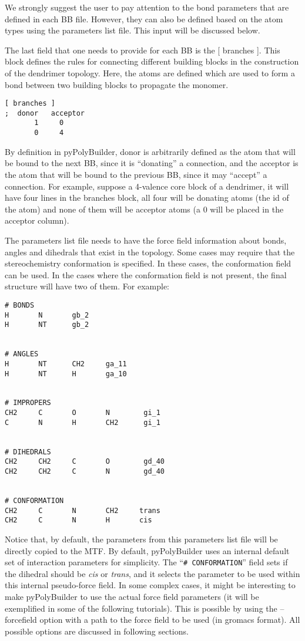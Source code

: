 \documentclass[12pt]{article}
\begin{document}
We strongly suggest the user to pay attention to the bond parameters that are defined in each BB file.
However, they can also be defined based on the atom types using the  parameters list file.
This input will be discussed below.

The last field that one needs to provide for each BB is the [ branches ].
This block defines the rules for connecting different building blocks in the construction of the dendrimer topology.
Here, the atoms are defined which are used to form a bond between two building blocks to propagate the monomer.
\begin{lstlisting}
[ branches ]
;  donor   acceptor
       1	 0
       0	 4
\end{lstlisting}

By definition in pyPolyBuilder,  donor is arbitrarily defined as the  atom that will be bound to the next BB, since it is ``donating'' a connection, and the acceptor is the atom that will be bound to the previous BB, since it may ``accept'' a connection. For example, suppose a 4-valence core block of a dendrimer, it will have four lines in the branches block, all four will be donating atoms (the id of the atom) and none of them will be acceptor atoms (a 0 will be placed in the acceptor column). 

The parameters list file needs to have the force field information about bonds, angles and dihedrals that exist in the topology.
Some cases may require that the stereochemistry conformation is specified.
In these cases, the conformation field can be used. In the cases where the conformation field is not present, the  final structure will have two of them. For example:

\begin{lstlisting}
# BONDS
H       N       gb_2
H       NT      gb_2
   

# ANGLES
H       NT      CH2     ga_11
H       NT      H       ga_10


# IMPROPERS
CH2     C       O       N        gi_1
C       N       H       CH2      gi_1


# DIHEDRALS
CH2     CH2     C       O        gd_40
CH2     CH2     C       N        gd_40


# CONFORMATION
CH2     C       N       CH2     trans
CH2     C       N       H       cis  
\end{lstlisting}

Notice that, by default, the parameters from this parameters list file will be directly copied to the MTF.
By default, pyPolyBuilder uses an internal default set of interaction parameters for simplicity.
The ``\texttt{\# CONFORMATION}'' field sets if the dihedral should be {\it cis} or {\it trans}, and it selects the parameter to be used within this internal pseudo-force field.
In some complex cases, it might be interesting to make pyPolyBuilder to use the actual force field parameters (it will be exemplified in some of the following tutorials).
This is possible by using the --forcefield option with a path to the force field to be used (in gromacs format).
All possible options are discussed in following sections.
\end{document}
